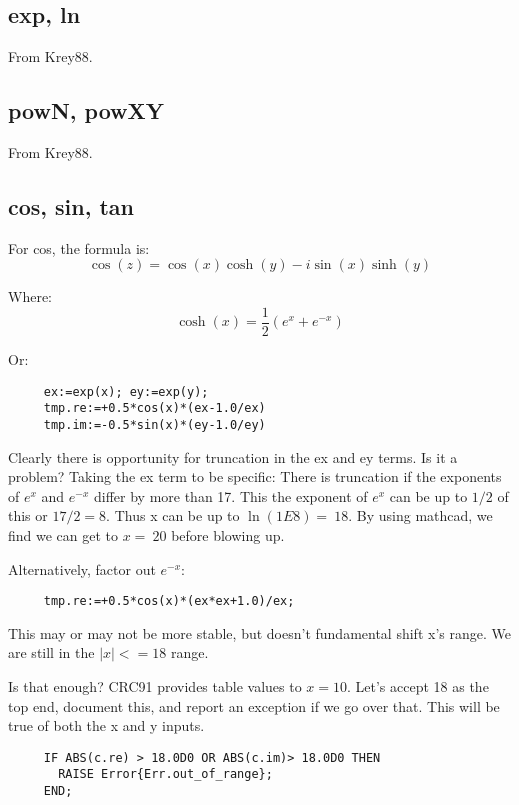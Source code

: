 \subsection*{exp, ln}
From Krey88.

\subsection*{powN, powXY}
From Krey88.


\subsection*{cos, sin, tan}
For cos, the formula is:
\begin{equation}
  \cos(z)=\cos(x)\cosh(y) - i \sin(x)\sinh(y)
\end{equation}

Where:
\begin{equation}
  \cosh(x)=\frac{1}{2}(e^{x} + e^{-x})
\end{equation}

Or:
\begin{verbatim}
     ex:=exp(x); ey:=exp(y);
     tmp.re:=+0.5*cos(x)*(ex-1.0/ex)
     tmp.im:=-0.5*sin(x)*(ey-1.0/ey)
\end{verbatim}

Clearly there is opportunity for truncation in the ex and ey
terms.  Is it a problem? Taking the ex term to be specific:
There is truncation if the exponents of $e^x$ and $e^{-x}$ differ
by more than 17.  This the exponent of $e^x$ can be up to $1/2$
of this or $17/2 = 8$.  Thus x can be up to $\ln(1E8)=~18$.  By
using mathcad, we find we can get to $x=~20$ before blowing
up.

Alternatively, factor out $e^{-x}$:
\begin{verbatim}
     tmp.re:=+0.5*cos(x)*(ex*ex+1.0)/ex;
\end{verbatim}

This may or may not be more stable, but doesn't fundamental
shift x's range.  We are still in the $|x|<=18$ range.

Is that enough?  CRC91 provides table values to $x=10$.  Let's
accept 18 as the top end, document this, and report an
exception if we go over that.  This will be true of both the
x and y inputs.
\begin{tt} \begin{verbatim}
     IF ABS(c.re) > 18.0D0 OR ABS(c.im)> 18.0D0 THEN
       RAISE Error{Err.out_of_range};
     END;
\end{verbatim} \end{tt}

